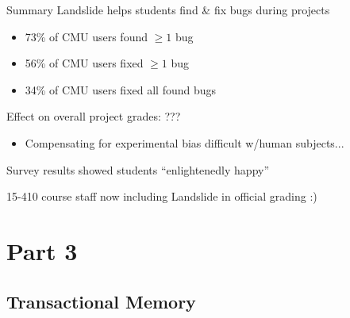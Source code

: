\documentclass[xcolor=dvipsnames]{beamer}
\begin{document}
\begin{frame}{Summary}
	Landslide helps students find \& fix bugs during projects
	\begin{itemize}
		\item 73\% of CMU users found $\ge 1$ bug
		\item 56\% of CMU users fixed $\ge 1$ bug
		\item 34\% of CMU users fixed all found bugs
	\end{itemize}
	\linegap

	Effect on overall project grades: ???
	\begin{itemize}
		\item Compensating for experimental bias difficult w/human subjects...
	\end{itemize}
	\linegap

	Survey results showed students ``enlightenedly happy'' %
	\linegap

	15-410 course staff now including Landslide in official grading :)
\end{frame}



\section{Part 3}
\subsection{Transactional Memory}
\newcommand\xbegin{\texttt{\_xbegin()}\xspace}
\newcommand\xend{\texttt{\_xend()}\xspace}
\newcommand\xabort{\texttt{\_xabort()}\xspace}

\end{document}
